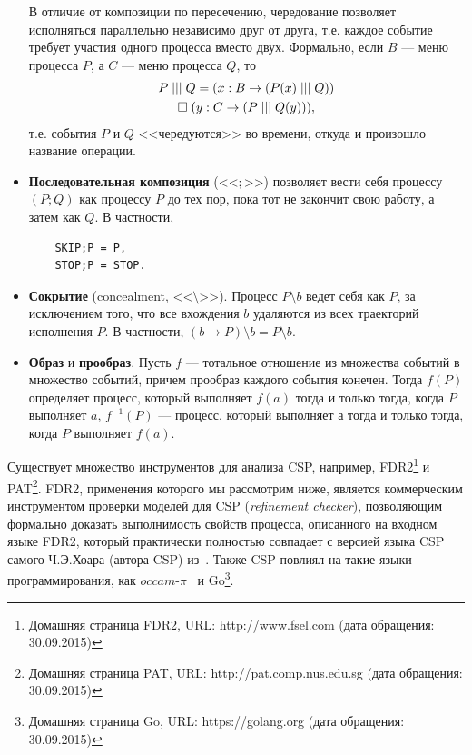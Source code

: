\documentclass[conference]{IEEEtran}
\begin{document}
\begin{itemize}
    В отличие от композиции по пересечению, чередование позволяет исполняться 
    параллельно независимо друг от друга, т.е. каждое событие требует участия 
    одного процесса вместо двух. Формально, если $B$ --- меню процесса $P$, а $C$
    --- меню процесса $Q$, то
    \begin{multline}
      $$P\;|||\;Q=(x:B\rightarrow(P(x)\;|||\;Q))\\
        \Box\;(y:C\rightarrow(P\;|||\;Q(y))),$$
    \end{multline}
    т.е. события $P$ и $Q$ <<чередуются>> во времени, откуда и произошло 
    название операции.
  \item \textbf{Последовательная композиция} (<<$;$>>) позволяет вести себя процессу 
    $(P;Q)$ как процессу $P$ до тех пор, пока тот не закончит свою работу, а 
    затем как $Q$. В частности, 
    \begin{verbatim}
    SKIP;P = P, 
    STOP;P = STOP.\end{verbatim}
  \item \textbf{Сокрытие} (concealment, <<$\setminus$>>). Процесс $P\setminus{b}$ ведет себя как $P$, 
    за исключением того, что все вхождения $b$ удаляются из всех траекторий 
    исполнения $P$. В частности, $(b\rightarrow{P}) \setminus b = P \setminus b$.
  \item \textbf{Образ} и \textbf{прообраз}. Пусть $f$ --- тотальное отношение из множества событий 
    в множество событий, причем прообраз каждого события конечен. Тогда $f(P)$ 
    определяет процесс, который выполняет $f(a)$ тогда и только тогда, когда $P$ 
    выполняет $a$, $f^{-1}(P)$ --- процесс, который выполняет а тогда и только 
    тогда, когда $P$ выполняет $f(a)$.
\end{itemize}

Существует множество инструментов для анализа CSP, например, 
FDR2\footnote{Домашняя страница FDR2, URL: http://www.fsel.com (дата обращения: 30.09.2015)} и
PAT\footnote{Домашняя страница PAT, URL: http://pat.comp.nus.edu.sg (дата обращения: 30.09.2015)}. 
FDR2, применения которого мы рассмотрим 
ниже, является коммерческим инструментом проверки моделей для CSP 
(\textit{refinement checker}), позволяющим формально доказать выполнимость свойств 
процесса, описанного на входном языке FDR2, который практически полностью 
совпадает с версией языка CSP самого Ч.Э.Хоара (автора CSP) из~\cite{hoare1985csp}. 
Также CSP повлиял на такие языки программирования, как $occam\mbox{-}\pi$~\cite{welch2005communicating} и 
Go\footnote{Домашняя страница Go, URL: https://golang.org (дата обращения: 30.09.2015)}.
\end{document}
